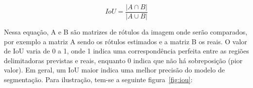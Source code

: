 \begin{equation}\label{eq:iou}
  IoU = \dfrac{\left| A \cap B \right|}{\left| A \cup B \right|}
\end{equation}


Nessa equação, A e B são matrizes de rótulos da imagem onde serão
comparados, por exemplo a matriz A sendo os rótulos estimados e a
matriz B os reais. O valor de IoU varia de 0 a 1, onde 1 indica uma
correspondência perfeita entre as regiões delimitadoras previstas e
reais, enquanto 0 indica que não há sobreposição (pior valor). Em
geral, um IoU maior indica uma melhor precisão do modelo de
segmentação. Para ilustração, tem-se a seguinte figura~\ref{fig:iou}:

\begin{figure}[h!]
        \captionsetup{width=12cm}
		\centering
\end{figure}
\FloatBarrier{}

